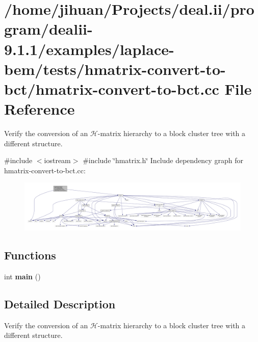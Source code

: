 \hypertarget{hmatrix-convert-to-bct_8cc}{}\section{/home/jihuan/\+Projects/deal.ii/program/dealii-\/9.1.1/examples/laplace-\/bem/tests/hmatrix-\/convert-\/to-\/bct/hmatrix-\/convert-\/to-\/bct.cc File Reference}
\label{hmatrix-convert-to-bct_8cc}


Verify the conversion of an $\mathcal{H}$-\/matrix hierarchy to a block cluster tree with a different structure.  


{\ttfamily \#include $<$iostream$>$}\newline
{\ttfamily \#include \char`\"{}hmatrix.\+h\char`\"{}}\newline
Include dependency graph for hmatrix-\/convert-\/to-\/bct.cc\+:\nopagebreak
\begin{figure}[H]
\begin{center}
\leavevmode
\includegraphics[width=350pt]{hmatrix-convert-to-bct_8cc__incl}
\end{center}
\end{figure}
\subsection*{Functions}
\begin{DoxyCompactItemize}
\item 
\mbox{\label{hmatrix-convert-to-bct_8cc_ae66f6b31b5ad750f1fe042a706a4e3d4}} 
int {\bfseries main} ()
\end{DoxyCompactItemize}


\subsection{Detailed Description}
Verify the conversion of an $\mathcal{H}$-\/matrix hierarchy to a block cluster tree with a different structure. 


